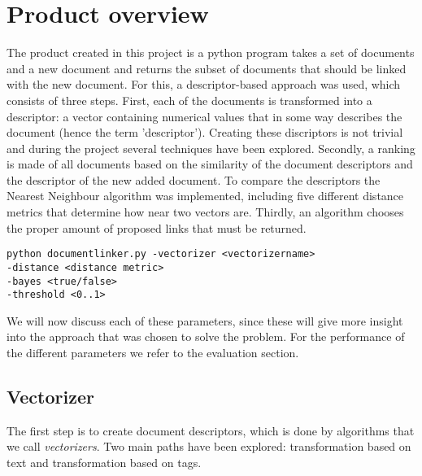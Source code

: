\section{Product overview}

The product created in this project is a python program takes a set of documents and a new document and returns the subset of documents that should be linked with the new document. For this, a descriptor-based approach was used, which consists of three steps. First, each of the documents is transformed into a descriptor: a vector containing numerical values that in some way describes the document (hence the term 'descriptor'). Creating these discriptors is not trivial and during the project several techniques have been explored. Secondly, a ranking is made of all documents based on the similarity of the document descriptors and the descriptor of the new added document. To compare the descriptors the Nearest Neighbour algorithm was implemented, including five different distance metrics that determine how near two vectors are. Thirdly, an algorithm chooses the proper amount of proposed links that must be returned.

\begin{lstlisting}
python documentlinker.py -vectorizer <vectorizername> 
-distance <distance metric> 
-bayes <true/false>
-threshold <0..1>
\end{lstlisting}

We will now discuss each of these parameters, since these will give more insight into the approach that was chosen to solve the problem. For the performance of the different parameters we refer to the evaluation section. 

\subsection{Vectorizer}
The first step is to create document descriptors, which is done by algorithms that we call \emph{vectorizers}. Two main paths have been explored: transformation based on text and transformation based on tags.

